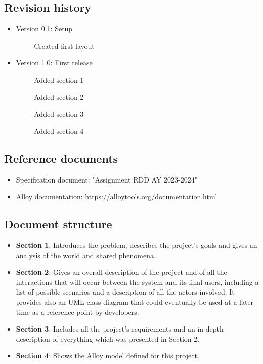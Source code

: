 \documentclass[../RASD.tex]{subfiles}
\begin{document}
    \subsection{Revision history}
        \begin{itemize}
            \item Version 0.1: Setup
            \begin{itemize}
                \item[--] Created first layout 
            \end{itemize}
            \item Version 1.0: First release
            \begin{itemize}
                \item[--] Added section 1
                \item[--] Added section 2
                \item[--] Added section 3
                \item[--] Added section 4
            \end{itemize}
        \end{itemize}

    \subsection{Reference documents}
        \begin{itemize}
            \item Specification document: "Assignment RDD AY 2023-2024"
            \item Alloy documentation: https://alloytools.org/documentation.html
        \end{itemize}
    
    \subsection{Document structure}
        \begin{itemize}
            \item \textbf{Section 1}: Introduces the problem, describes the project's goals and gives an analysis of the world and shared phenomena.
            \item \textbf{Section 2}: Gives an overall description of the project and of all the interactions that will occur between the system and its final users, including a list of possible scenarios and a description of all the actors involved. It provides also an UML class diagram that could eventually be used at a later time as a reference point by developers.
            \item \textbf{Section 3}: Includes all the project's requirements and an in-depth description of everything which was presented in Section 2.
            \item \textbf{Section 4}: Shows the Alloy model defined for this project.
        \end{itemize}
\end{document}
